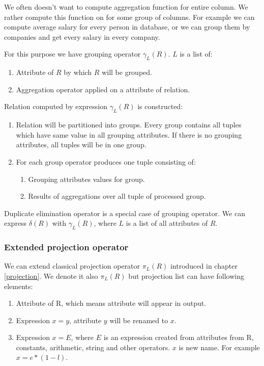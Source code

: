 We often doesn't want to compute aggregation function for entire column. We rather compute this function on for some group of columns. For example we can compute average salary for every person in database, or we can group them by companies and get every salary in every company. 

For this purpose we have grouping operator $\gamma_L(R)$. $L$ is a list of:

\begin{enumerate}
\item Attribute of $R$ by which $R$ will be grouped.
\item Aggregation operator applied on a attribute of relation.
\end{enumerate}

Relation computed by expression $\gamma_L(R)$ is constructed:

\begin{enumerate}
\item Relation will be partitioned into groups. Every group contains all tuples which have same value in all grouping attributes. If there is no grouping attributes, all tuples will be in one group.
\item For each group operator produces one tuple consisting of:
 \begin{enumerate}
 	\item Grouping attributes values for group.
 	\item Results of aggregations over all tuple of processed group.
 \end{enumerate}
\end{enumerate}

Duplicate elimination operator is a special case of grouping operator. We can express $\delta(R)$ with $\gamma_{L}(R)$, where $L$ is a list of all attributes of $R$.

\subsubsection{Extended projection operator}

We can extend classical projection operator $\pi_L(R)$ introduced in chapter \ref{projection}. We denote it also $\pi_L(R)$ but projection list can have following elements:

\begin{enumerate}
\item Attribute of R, which means attribute will appear in output.
\item Expression $x = y$, attribute $y$ will be renamed to $x$.
\item Expression $x = E$, where $E$ is an expression created from attributes from R, constants, arithmetic, string  and other operators. $x$ is new name. For example $x=e*(1-l)$.
\end{enumerate}



